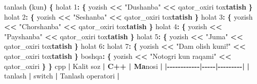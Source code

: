 \documentclass[a4paper,11pt,twoside,openright]{book}
\newenvironment{Shaded}{\begin{snugshade}}{\end{snugshade}}
\newcommand{\CharTok}[1]{\textcolor[rgb]{0.31,0.60,0.02}{#1}}
\newcommand{\DecValTok}[1]{\textcolor[rgb]{0.00,0.00,0.81}{#1}}
\newcommand{\ErrorTok}[1]{\textcolor[rgb]{0.64,0.00,0.00}{\textbf{#1}}}
\newcommand{\NormalTok}[1]{#1}
\newcommand{\OperatorTok}[1]{\textcolor[rgb]{0.81,0.36,0.00}{\textbf{#1}}}
\newcommand{\StringTok}[1]{\textcolor[rgb]{0.31,0.60,0.02}{#1}}
\begin{document}
\begin{Shaded}
\begin{Highlighting}[]
\NormalTok{tanlash }\OperatorTok{(}\NormalTok{kun}\OperatorTok{)} \OperatorTok{\{}
\NormalTok{    holat }\DecValTok{1}\OperatorTok{:} \OperatorTok{\{}
\NormalTok{        yozish }\OperatorTok{\textless{}\textless{}} \StringTok{"Dushanba"} \OperatorTok{\textless{}\textless{}}\NormalTok{ qator\_oxiri}
\NormalTok{        to}\CharTok{\textquotesingle{}x}\ErrorTok{tatish}
    \OperatorTok{\}}
\NormalTok{    holat }\DecValTok{2}\OperatorTok{:} \OperatorTok{\{}
\NormalTok{        yozish }\OperatorTok{\textless{}\textless{}} \StringTok{"Seshanba"} \OperatorTok{\textless{}\textless{}}\NormalTok{ qator\_oxiri}
\NormalTok{        to}\CharTok{\textquotesingle{}x}\ErrorTok{tatish}
    \OperatorTok{\}}
\NormalTok{    holat }\DecValTok{3}\OperatorTok{:} \OperatorTok{\{}
\NormalTok{        yozish }\OperatorTok{\textless{}\textless{}} \StringTok{"Chorshanba"} \OperatorTok{\textless{}\textless{}}\NormalTok{ qator\_oxiri}
\NormalTok{        to}\CharTok{\textquotesingle{}x}\ErrorTok{tatish}
    \OperatorTok{\}}
\NormalTok{    holat }\DecValTok{4}\OperatorTok{:} \OperatorTok{\{}
\NormalTok{        yozish }\OperatorTok{\textless{}\textless{}} \StringTok{"Payshanba"} \OperatorTok{\textless{}\textless{}}\NormalTok{ qator\_oxiri}
\NormalTok{        to}\CharTok{\textquotesingle{}x}\ErrorTok{tatish}
    \OperatorTok{\}}
\NormalTok{    holat }\DecValTok{5}\OperatorTok{:} \OperatorTok{\{}
\NormalTok{        yozish }\OperatorTok{\textless{}\textless{}} \StringTok{"Juma"} \OperatorTok{\textless{}\textless{}}\NormalTok{ qator\_oxiri}
\NormalTok{        to}\CharTok{\textquotesingle{}x}\ErrorTok{tatish}
    \OperatorTok{\}}
\NormalTok{    holat }\DecValTok{6}\OperatorTok{:}
\NormalTok{    holat }\DecValTok{7}\OperatorTok{:} \OperatorTok{\{}
\NormalTok{        yozish }\OperatorTok{\textless{}\textless{}} \StringTok{"Dam olish kuni!"} \OperatorTok{\textless{}\textless{}}\NormalTok{ qator\_oxiri}
\NormalTok{        to}\CharTok{\textquotesingle{}x}\ErrorTok{tatish}
    \OperatorTok{\}}
\NormalTok{    boshqa}\OperatorTok{:} \OperatorTok{\{}
\NormalTok{        yozish }\OperatorTok{\textless{}\textless{}} \StringTok{"Noto\textquotesingle{}g\textquotesingle{}ri kun raqami"} \OperatorTok{\textless{}\textless{}}\NormalTok{ qator\_oxiri}
    \OperatorTok{\}}
\OperatorTok{\}}
\ErrorTok{\textasciigrave{}\textasciigrave{}\textasciigrave{}}\NormalTok{cpp}
\OperatorTok{|}\NormalTok{ Kalit so}\CharTok{\textquotesingle{}z}\ErrorTok{ | C++ | Ma}\CharTok{\textquotesingle{}}\NormalTok{nosi }\OperatorTok{|}
\OperatorTok{|{-}{-}{-}{-}{-}{-}{-}{-}{-}{-}{-}{-}|{-}{-}{-}{-}{-}|{-}{-}{-}{-}{-}{-}{-}{-}{-}|}
\OperatorTok{|} \ErrorTok{\textasciigrave{}}\NormalTok{tanlash}\ErrorTok{\textasciigrave{}} \OperatorTok{|} \ErrorTok{\textasciigrave{}}\NormalTok{switch}\ErrorTok{\textasciigrave{}} \OperatorTok{|}\NormalTok{ Tanlash operatori }\OperatorTok{|}

\end{Highlighting}
\end{Shaded}
\end{document}
